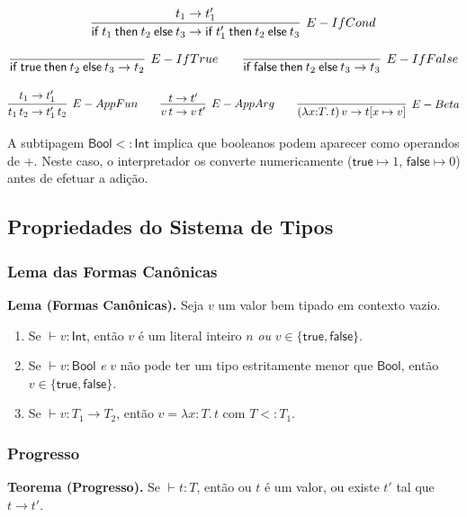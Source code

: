 \[ \infer[E-IfCond]{\mathsf{if}\: t_1\:\mathsf{then}\: t_2\:
    \mathsf{else}\: t_3 \to \mathsf{if}\: t_1'\: \mathsf{then}\: t_2\:
\mathsf{else}\: t_3}{t_1 \to t_1'} \]

\[ \infer[E-IfTrue]{\mathsf{if}\: \mathsf{true}\: \mathsf{then}\: t_2\:
  \mathsf{else}\: t_3 \to t_2}{} \qquad \infer[E-IfFalse]{\mathsf{if}\:
\mathsf{false}\: \mathsf{then}\: t_2\: \mathsf{else}\: t_3 \to t_3}{} \]

\[ \infer[E-AppFun]{t_1\, t_2 \to t_1'\, t_2}{t_1 \to t_1'} \qquad
  \infer[E-AppArg]{v\, t \to v\, t'}{t \to t'} \qquad \infer[E-Beta]{(\lambda x
{:} T.\, t)\, v \to t[x \mapsto v]}{} \]

A subtipagem \(\mathsf{Bool} <: \mathsf{Int}\) implica que booleanos
podem aparecer como operandos de \(+\). Neste caso, o interpretador
os converte numericamente (\(\mathsf{true} \mapsto 1\),
\(\mathsf{false} \mapsto 0\)) antes de efetuar a adição.

\subsection{Propriedades do Sistema de Tipos}

\subsubsection{Lema das Formas Canônicas}

\textbf{Lema (Formas Canônicas).} Seja \(v\) um valor bem tipado em
contexto vazio.

\begin{enumerate}
  \item
    Se \(\vdash v : \mathsf{Int}\), então \(v\) é um literal inteiro
    \(n\) \emph{ou} \(v \in \{\mathsf{true}, \mathsf{false}\}\).
  \item
    Se \(\vdash v : \mathsf{Bool}\) \emph{e} \(v\) não pode ter um
    tipo estritamente menor que \(\mathsf{Bool}\), então
    \(v \in \{\mathsf{true}, \mathsf{false}\}\).
  \item
    Se \(\vdash v : T_1 \to T_2\), então \(v = \lambda x {:} T.\, t\)
    com \(T <: T_1\).
\end{enumerate}

\subsubsection{Progresso}

\textbf{Teorema (Progresso).} Se \(\vdash t : T\), então ou \(t\) é
um valor, ou existe \(t'\) tal que \(t \to t'\).

